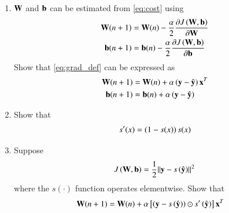 \documentclass[journal,12pt,twocolumn]{IEEEtran}
\renewcommand\thesection{\arabic{section}}
\begin{document}
\begin{enumerate}[label=\thesection.\arabic*
,ref=\thesection.\theenumi]
\begin{align}
\frac{\partial \norm{\mbf{y}-\hat{\vec{y}}}^2} {\partial\mbf{b}} = -2\brak{\vec{y}-\hat{\vec{y}}}
\end{align}
\item $\mathbf{W}$ and $\mathbf{b}$ can be estimated from \eqref{eq:cost} using
\begin{align}
\label{eq:grad_def}
\mathbf{W}(n+1) &= \mathbf{W}(n) - \frac{\alpha}{2}\frac{\partial J\left(\mathbf{W},\mathbf{b}\right) }{\partial\mathbf{W}}
\\
\mathbf{b}(n+1) &= \mathbf{b}(n) - \frac{\alpha}{2}\frac{\partial J\left(\mathbf{W},\mathbf{b}\right)}{\partial\mathbf{b}}
\end{align}
Show that \eqref{eq:grad_def} can be expressed as
\begin{align}
\mathbf{W}(n+1) &= \mathbf{W}(n) + \alpha\left(\mathbf{y}-\hat{\mathbf{y}}\right)\mathbf{x}^T
\\
\mathbf{b}(n+1) &= \mathbf{b}(n) + \alpha\left(\mathbf{y}-\hat{\mathbf{y}}\right)
\end{align}
\item Show that 
\begin{align}
\label{eq:sig_der}
s^{\prime}(x)=\left(1-s(x)\right)s(x)
\end{align}
\item Suppose
\begin{equation}
\label{eq:cost_new}
 J\left(\mathbf{W},\mathbf{b}\right)  = \frac{1}{2}\lVert\mathbf{y}-s\left(\hat{\mathbf{y}}\right)\rVert^2
\end{equation}
%
where the $s(\cdot)$ function operates elementwise.  Show that 
\begin{align}
\mbf{W}(n+1) &= \mbf{W}(n) + \alpha\sbrak{\brak{\vec{y}-s\brak{\hat{\vec{y}}}}\odot s^{\prime}\brak{\hat{\vec{y}}}}\vec{x}^T

\end{align}
\end{enumerate}
\end{document}
